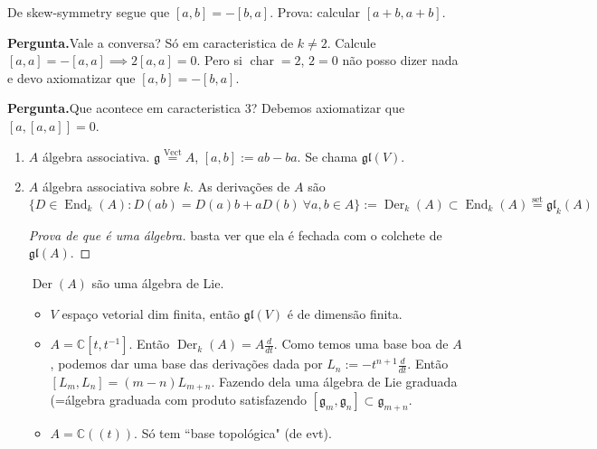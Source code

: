 \begin{remark}
\label{remark-heluani-skew}
De skew-symmetry segue que $[a,b]=-[b,a]$.
Prova: calcular  $[a+b,a+b]$.

{\bf Pergunta.}\hspace{.5em}Vale a conversa?
Só em caracteristica de $k \neq 2$. Calcule
$[a,a]=-[a,a]\implies 2[a,a]=0$. Pero si
$\operatorname{char}=2$, $2=0$ não posso
dizer nada e devo axiomatizar que
$[a,b]=-[b,a]$.

{\bf Pergunta.}\hspace{.5em}Que acontece em
caracteristica 3? Debemos axiomatizar que
$[a,[a,a]]=0$.
\end{remark}

\begin{example}
\label{example-heluani-lie-algebras}
\begin{enumerate}
\item $A$ álgebra associativa.
$\mathfrak{g}\overset{\operatorname{Vect}}{=}
A$,
$[a,b]:=ab-ba$. Se chama $\mathfrak{gl}(V)$.
\item $A$ álgebra associativa sobre $k$. As
derivações de $A$ são
$$\{D \in
\operatorname{End}_k(A):D(ab)=D(a)b+aD(b)\
\forall a,b \in A\}:=\operatorname{Der}_k(A)
\subset \operatorname{End}_k(A)
\overset{\operatorname{set}}{=}\mathfrak{gl}
_k(A)$$
\begin{proof}[Prova de que é uma álgebra]
basta ver que ela é fechada com o colchete de
$\mathfrak{gl}(A)$.
\end{proof}
\begin{corollary}
\label{corollary-heluani-der}
$\operatorname{Der}(A)$ são uma álgebra de
Lie.
\end{corollary}
\begin{itemize}
\item  $V$ espaço vetorial dim finita, então
$\mathfrak{gl}(V)$ é de dimensão finita.
\item $A=\mathbb{C}[t,t^{-1}]$. Então
$\operatorname{Der}_k(A)=A \frac{d}{dt}$.
Como temos uma base boa de $A$, podemos dar
uma base das derivações dada por
$L_n:=-t^{n+1}\frac{d}{dt}$. Então
$[L_m,L_n]=(m-n)L_{m+n}$. Fazendo dela uma
álgebra de Lie graduada (=álgebra graduada
com produto satisfazendo
$[\mathfrak{g}_m,\mathfrak{g}_n]\subset
\mathfrak{g}_{m+n}$.

\item $A=\mathbb{C}((t))$. Só tem ``base
topológica" (de evt).
\end{itemize}
\end{enumerate}
\end{example}


